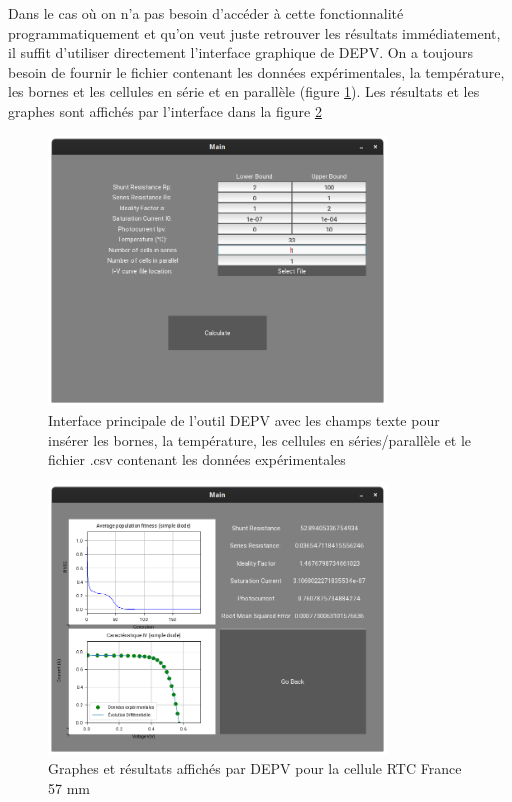 Dans le cas où on n'a pas besoin d'accéder à cette fonctionnalité programmatiquement et qu'on veut juste retrouver les résultats immédiatement, il suffit d'utiliser directement l'interface graphique de DEPV. On a toujours besoin de fournir le fichier contenant les données expérimentales, la température, les bornes et les cellules en série et en parallèle (figure \ref{fig:depvmain}). Les résultats et les graphes sont affichés par l'interface dans la figure \ref{fig:depvres}

\begin{figure}[H]
  \begin{center}
    \includegraphics[width=0.8\textwidth]{resources/paramwindow.png}
    \caption{Interface principale de l'outil DEPV avec les champs texte pour insérer les bornes, la température, les cellules en séries/parallèle et le fichier .csv contenant les données expérimentales}
    \label{fig:depvmain}
  \end{center}
\end{figure}

\begin{figure}[H]
  \begin{center}
    \includegraphics[width=0.8\textwidth]{resources/reswindow.png}
    \caption{Graphes et résultats affichés par DEPV pour la cellule RTC France 57 mm}
    \label{fig:depvres}
  \end{center}
\end{figure}

